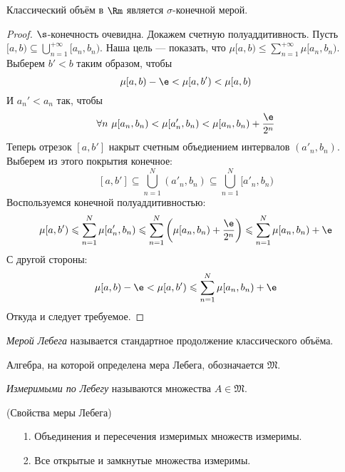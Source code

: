 \begin{theorem}
    Классический объём в $\Rm$ является $\sigma$-конечной мерой.
\end{theorem}
\begin{proof}
	$\s$-конечность очевидна. Докажем счетную полуаддитивность. Пусть
	$[a, b) \subseteq \bigcup_{n = 1}^{+\infty}{[a_n, b_n)}$. Наша цель ---
	показать, что $\mu[a, b) \leqslant \sum_{n = 1}^{+\infty}{\mu[a_n, b_n)}$.
	Выберем $b' < b$ таким образом, чтобы
\[
	\mu[a, b) - \e < \mu[a, b') < \mu[a, b)
\]
	И $a_n' < a_n$ так, чтобы
\[
	\forall n~ \mu[a_n, b_n) < \mu[a_n', b_n) < \mu[a_n, b_n) + \frac{\e}{2^n}
\]
	Теперь отрезок $[a, b']$ накрыт счетным объедиением интервалов $(a'_n, b_n)$.
	Выберем из этого покрытия конечное:
\[
	[a, b'] \subseteq \bigcup_{n = 1}^{N}{(a'_n, b_n)} \subseteq
	\bigcup_{n = 1}^{N}{[a'_n, b_n)}
\]
	Воспользуемся конечной полуаддитивностью:
\[
	\mu[a, b') \leqslant \sum_{n = 1}^{N}{\mu[a'_n, b_n)} \leqslant
	\sum_{n = 1}^{N}{\left(\mu[a_n, b_n) + \frac{\e}{2^n}\right)} \leqslant
	\sum_{n = 1}^{N}{\mu[a_n, b_n)} + \e
\]
	С другой стороны:
\[
	\mu[a, b) - \e < \mu[a, b') \leqslant \sum_{n = 1}^{N}{\mu[a_n, b_n)} + \e
\]
	Откуда и следует требуемое.
\end{proof}

\begin{definition}
    \textit{Мерой Лебега} называется стандартное продолжение классического объёма.
\end{definition}

\begin{definition}
    Алгебра, на которой определена мера Лебега, обозначается $\mathfrak{M}$.
\end{definition}

\begin{definition}
    \textit{Измеримыми по Лебегу} называются множества $A \in \mathfrak{M}$.
\end{definition}

\begin{theorem}(Свойства меры Лебега)
    \begin{itemize}
        \item[1.] Объединения и пересечения измеримых множеств измеримы.
        \item[2.] Все открытые и замкнутые множества измеримы.
    \end{itemize}
\end{theorem}

